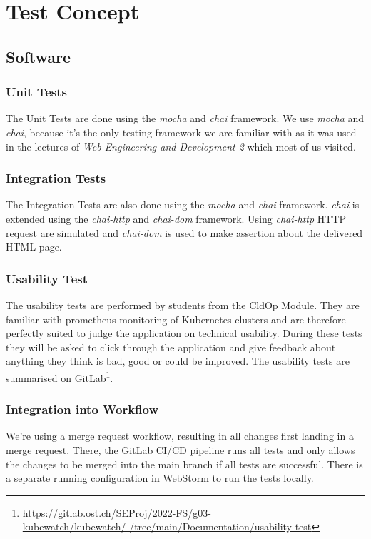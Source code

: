 \chapter{Test Concept}

\section{Software}
\subsection{Unit Tests}
The Unit Tests are done using the \textit{mocha} and \textit{chai} framework. We use \textit{mocha} and \textit{chai}, because it's the only testing framework we are familiar with as it was used in the lectures of \textit{Web Engineering and Development 2} which most of us visited.

\subsection{Integration Tests}
The Integration Tests are also done using the \textit{mocha} and \textit{chai} framework.
\textit{chai} is extended using the \textit{chai-http} and \textit{chai-dom} framework.
Using \textit{chai-http} HTTP request are simulated and \textit{chai-dom} is used to make assertion about the delivered HTML page.

\subsection{Usability Test}
The usability tests are performed by students from the CldOp Module.
They are familiar with prometheus monitoring of Kubernetes clusters and are therefore perfectly suited to judge the application on technical usability.
During these tests they will be asked to click through the application
and give feedback about anything they think is bad, good or could be improved.
The usability tests are summarised on GitLab\footnote{\url{https://gitlab.ost.ch/SEProj/2022-FS/g03-kubewatch/kubewatch/-/tree/main/Documentation/usability-test}}.

\subsection{Integration into Workflow}
We're using a merge request workflow, resulting in all changes first landing in a merge request.
There, the GitLab CI/CD pipeline runs all tests and only allows the changes to be merged into the main branch if all tests are successful.
There is a separate running configuration in WebStorm to run the tests locally.

